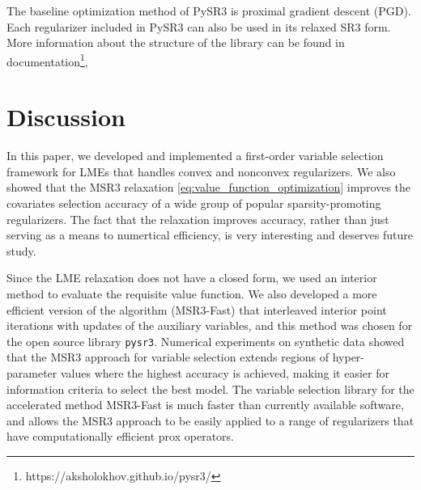 The baseline optimization method of PySR3 is proximal gradient descent (PGD). Each regularizer included in PySR3 can also be used in its relaxed SR3 form. More information about the structure of the library can be found in documentation\footnote{https://aksholokhov.github.io/pysr3/}, 

\section{Discussion}
\label{sec:discussion}

    In this paper, we developed and implemented a first-order variable selection framework for LMEs that handles convex and nonconvex regularizers. We also showed that 
    the MSR3 relaxation \eqref{eq:value_function_optimization} 
improves the covariates selection accuracy of a wide group of popular sparsity-promoting regularizers. The fact that the relaxation improves accuracy, rather than just serving as a means to {numertical efficiency, %
     is very interesting and deserves future study.} %
    
    Since the LME relaxation does not have a closed form, we used an interior method to evaluate the requisite value function. We also developed 
    a more efficient version of the algorithm  (MSR3-Fast) that interleaved interior point iterations with updates of the auxiliary variables, and this method was chosen for the 
    open source library \texttt{pysr3}. %
{ Numerical experiments on synthetic data showed that the MSR3 approach for variable selection extends regions of hyper-parameter values where the highest accuracy is achieved, making it easier for information criteria to select the best model.} 
 The variable selection library for the accelerated method MSR3-Fast is much faster than currently available software, and allows the MSR3 approach to be easily applied to a range of regularizers that have 
{computationally efficient prox operators.} %

